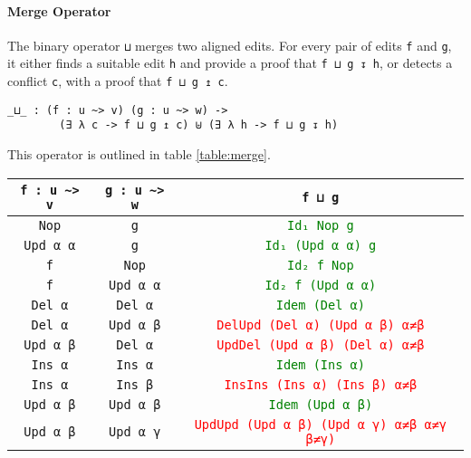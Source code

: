 \documentclass[preprint]{sigplanconf}
\begin{document}
	\paragraph{Merge Operator}
	The binary operator \texttt{⊔} merges 
	two aligned edits. For every pair of edits \texttt{f} and \texttt{g}, 
	it either finds a suitable edit \texttt{h} and provide
	a proof that \texttt{f ⊔ g ↧ h}, or detects a conflict \texttt{c}, 
	with a proof that \texttt{f ⊔ g ↥ c}.

\begin{verbatim}
_⊔_ : (f : u ~> v) (g : u ~> w) ->
        (∃ λ c -> f ⊔ g ↥ c) ⊎ (∃ λ h -> f ⊔ g ↧ h)
\end{verbatim}
	This operator is outlined in table \ref{table:merge}.			
	
	\begin{table*}[t]
	\centering
	\begin{tabular}{| c | c | c |}
	\hline
	\texttt{f : u \textasciitilde> v} & \texttt{g : u \textasciitilde> w} &  \texttt{f ⊔ g} 
	\\ \hline
	\texttt{Nop} & \texttt{g} & \textcolor{Green}{\texttt{Id₁ Nop g}} 
	\\ \hline
	\texttt{Upd α α} & \texttt{g} & \textcolor{Green}{\texttt{Id₁ (Upd α α) g}} 
	\\ \hline
	\texttt{f} & \texttt{Nop} & \textcolor{Green}{\texttt{Id₂ f Nop}} 
	\\ \hline
	\texttt{f} & \texttt{Upd α α} & \textcolor{Green}{\texttt{Id₂ f (Upd α α)}} 
	\\ \hline
	\texttt{Del α} & \texttt{Del α} & \textcolor{Green}{\texttt{Idem (Del α)}}
	\\ \hline
	\texttt{Del α} & \texttt{Upd α β} & \textcolor{Red}{\texttt{DelUpd (Del α) (Upd α β) α≠β}}
	\\ \hline
	\texttt{Upd α β} & \texttt{Del α} & \textcolor{Red}{\texttt{UpdDel (Upd α β) (Del α) α≠β}}
	\\ \hline
	\texttt{Ins α} & \texttt{Ins α} & \textcolor{Green}{\texttt{Idem (Ins α)}} 
	\\	\hline
	\texttt{Ins α} & \texttt{Ins β} & \textcolor{Red}{\texttt{InsIns (Ins α) (Ins β) α≠β}}
	\\	\hline
	\texttt{Upd α β} & \texttt{Upd α β} & \textcolor{Green}{\texttt{Idem (Upd α β)}}
	\\	\hline
	\texttt{Upd α β} & \texttt{Upd α γ} & \textcolor{Red}{\texttt{UpdUpd (Upd α β) (Upd α γ) α≠β α≠γ β≠γ)}}
	\\ \hline
	\end{tabular}
	
	\captionsetup{singlelinecheck=false, justification=centering}

	\caption{Implementation of merge operator. \\
	 \texttt{f ⊔ g :} \textcolor{Red}{\texttt{f ⊔ g ↥ c}} \texttt{⊎} \textcolor{Green}{\texttt{f ⊔ g ↧ h}}}	 
	\label{table:merge}
	\end{table*}
\end{document}
